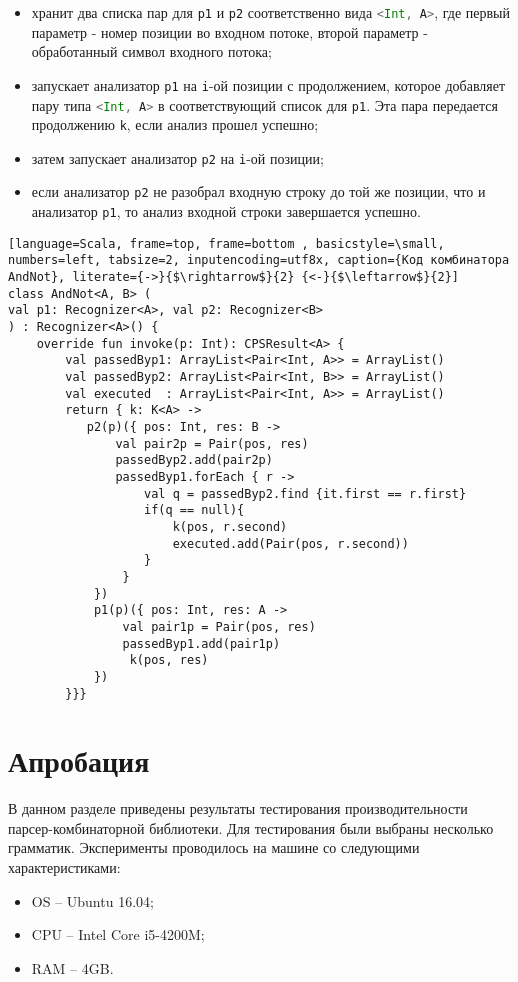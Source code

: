\begin{itemize}
    \item хранит два списка пар  для \lstinline[language=Scala]{p1} и \lstinline[language=Scala]{p2} соответственно вида \lstinline[language=Scala]{<Int, A>}, где первый параметр - номер позиции во входном потоке, второй параметр - обработанный символ входного потока;
    \item запускает анализатор \lstinline[language=Scala]{p1} на \lstinline[language=Scala]{i}-ой позиции с продолжением, которое добавляет пару типа \lstinline[language=Scala]{<Int, A>} в соответствующий список для \lstinline[language=Scala]{p1}. Эта пара передается продолжению \lstinline[language=Scala]{k}, если анализ прошел успешно;
    \item затем запускает анализатор \lstinline[language=Scala]{p2} на \lstinline[language=Scala]{i}-ой позиции;
    \item если анализатор \lstinline[language=Scala]{p2} не разобрал входную строку до той же позиции, что и анализатор \lstinline[language=Scala]{p1}, то анализ входной строки завершается успешно.
\end{itemize}

\begin{lstlisting}[language=Scala, frame=top, frame=bottom , basicstyle=\small, numbers=left, tabsize=2, inputencoding=utf8x, caption={Код комбинатора AndNot}, literate={->}{$\rightarrow$}{2} {<-}{$\leftarrow$}{2}]
class AndNot<A, B> (
val p1: Recognizer<A>, val p2: Recognizer<B>
) : Recognizer<A>() {
    override fun invoke(p: Int): CPSResult<A> {
        val passedByp1: ArrayList<Pair<Int, A>> = ArrayList()
        val passedByp2: ArrayList<Pair<Int, B>> = ArrayList()
        val executed  : ArrayList<Pair<Int, A>> = ArrayList()
        return { k: K<A> ->
           p2(p)({ pos: Int, res: B ->
               val pair2p = Pair(pos, res)
               passedByp2.add(pair2p)
               passedByp1.forEach { r ->
                   val q = passedByp2.find {it.first == r.first}
                   if(q == null){
                       k(pos, r.second)
                       executed.add(Pair(pos, r.second))
                   }
                }
            })
            p1(p)({ pos: Int, res: A ->
                val pair1p = Pair(pos, res)
                passedByp1.add(pair1p)
                 k(pos, res)
            })
        }}}
\end{lstlisting}

\section{Апробация}
В данном разделе приведены результаты тестирования производительности парсер-комбинаторной библиотеки. Для тестирования были выбраны несколько грамматик. Эксперименты проводилось на машине со следующими характеристиками:
\begin{itemize}
     \item  OS  -- Ubuntu 16.04;
     \item  CPU -- Intel Core i5-4200M;
     \item  RAM -- 4GB.
\end{itemize}

